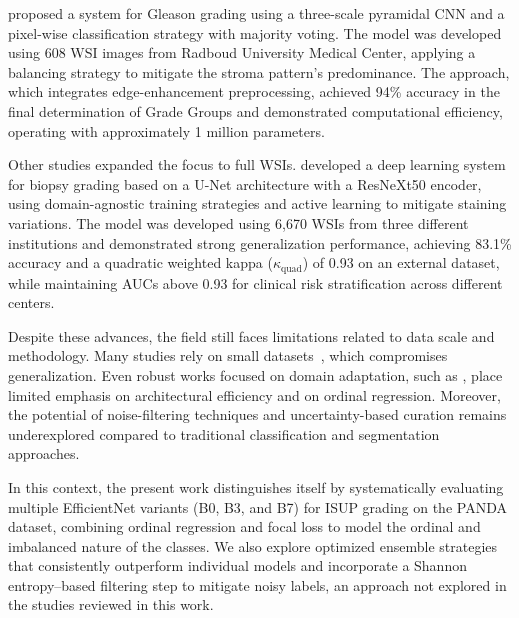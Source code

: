 \cite{ref-hammouda2021} proposed a system for Gleason grading using a three-scale pyramidal CNN and a pixel-wise classification strategy with majority voting. The model was developed using 608 WSI images from Radboud University Medical Center, applying a balancing strategy to mitigate the stroma pattern's predominance. The approach, which integrates edge-enhancement preprocessing, achieved 94\% accuracy in the final determination of Grade Groups and demonstrated computational efficiency, operating with approximately 1 million parameters.

Other studies expanded the focus to full WSIs. \cite{ref-singhal2022} developed a deep learning system for biopsy grading based on a U-Net architecture with a ResNeXt50 encoder, using domain-agnostic training strategies and active learning to mitigate staining variations. The model was developed using 6,670 WSIs from three different institutions and demonstrated strong generalization performance, achieving 83.1\% accuracy and a quadratic weighted kappa ($\kappa_{\text{quad}}$) of 0.93 on an external dataset, while maintaining AUCs above 0.93 for clinical risk stratification across different centers.

Despite these advances, the field still faces limitations related to data scale and methodology. Many studies rely on small datasets~\cite{ref-kott2019,ref-lucas2019}, which compromises generalization. Even robust works focused on domain adaptation, such as \cite{ref-singhal2022}, place limited emphasis on architectural efficiency and on ordinal regression. Moreover, the potential of noise-filtering techniques and uncertainty-based curation remains underexplored compared to traditional classification and segmentation approaches.

In this context, the present work distinguishes itself by systematically evaluating multiple EfficientNet variants (B0, B3, and B7) for ISUP grading on the PANDA dataset, combining ordinal regression and focal loss to model the ordinal and imbalanced nature of the classes. We also explore optimized ensemble strategies that consistently outperform individual models and incorporate a Shannon entropy–based filtering step to mitigate noisy labels, an approach not explored in the studies reviewed in this work.
